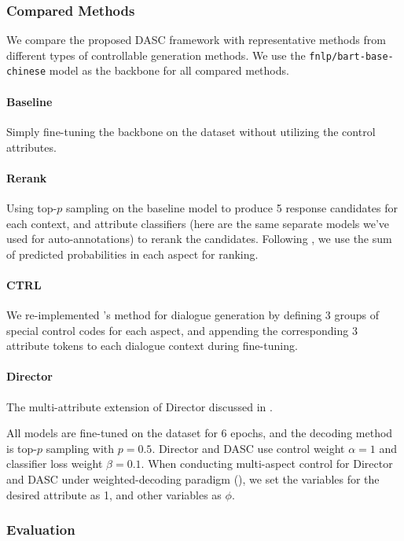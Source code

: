 \subsubsection{Compared Methods}
We compare the proposed DASC framework with representative methods from different types of controllable generation methods. We use the \texttt{fnlp/bart-base-chinese} \citep{shao2021cpt} model as the backbone for all compared methods.

\paragraph{Baseline} Simply fine-tuning the backbone on the dataset without utilizing the control attributes.

\paragraph{Rerank} Using top-$p$ sampling \citep{holtzman2019curious} on the baseline model to produce 5 response candidates for each context, and attribute classifiers (here are the same separate models we've used for auto-annotations) to rerank the candidates. Following \citet{thoppilan2022lamda}, we use the sum of predicted probabilities in each aspect for ranking. 

\paragraph{CTRL} We re-implemented \citet{keskar2019ctrl}'s method for dialogue generation by defining 3 groups of special control codes for each aspect, and appending the corresponding 3 attribute tokens to each dialogue context during fine-tuning.

\paragraph{Director} The multi-attribute extension of Director \citep{arora2022director} discussed in . 

All models are fine-tuned on the dataset for 6 epochs, and the decoding method is top-$p$ sampling with $p=0.5$. Director and DASC use control weight $\alpha=1$ and classifier loss weight $\beta=0.1$. When conducting multi-aspect control for Director and DASC under weighted-decoding paradigm (), we set the variables for the desired attribute as 1, and other variables as $\phi$.  

\subsubsection{Evaluation}
